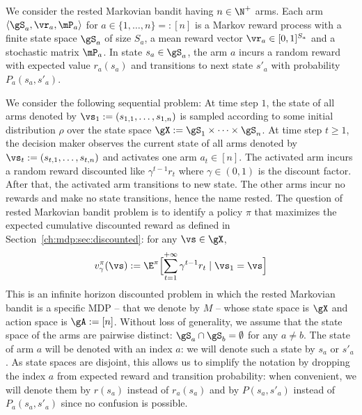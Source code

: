We consider the rested Markovian bandit having $n\in\N^+$ arms.
Each arm $\langle\gS_a, \vr_a, \mP_a\rangle$ for $a\in\{1,\dots,n\}=:[n]$ is a Markov reward process with a finite state space $\gS_a$ of size $S_a$, a mean reward vector $\vr_a\in[0,1]^{S_a}$ and a stochastic matrix $\mP_a$.
In state $s_a\in\gS_a$, the arm $a$ incurs a random reward with expected value $r_a(s_a)$ and transitions to next state $s'_a$ with probability $P_a(s_a,s'_a)$.

We consider the following sequential problem: At time step $1$, the state of all arms denoted by $\vs_1:=(s_{1,1},\dots,s_{1,n})$ is sampled according to some initial distribution $\rho$ over the state space $\gX:=\gS_1\times\dots\times\gS_n$.
At time step $t\ge1$, the decision maker observes the current state of all arms denoted by $\vs_t:=(s_{t,1},\dots,s_{t,n})$ and activates one arm $a_t\in[n]$.
The activated arm incurs a random reward discounted like $\gamma^{t-1}r_t$ where $\gamma\in(0,1)$ is the discount factor.
After that, the activated arm transitions to new state. %
The other arms incur no rewards and make no state transitions, hence the name rested.
The question of rested Markovian bandit problem is to identify a policy $\pi$ that maximizes the expected cumulative discounted reward as defined in Section~\ref{ch:mdp:sec:discounted}: for any $\vs\in\gX$,
\begin{equation}
    \label{ch:mb:value}
    v_\gamma^\pi(\vs):=\E^\pi\Bigl[\sum_{t=1}^{+\infty} \gamma^{t-1}r_t \mid \vs_1=\vs\Bigr]
\end{equation}
This is an infinite horizon discounted problem in which the rested Markovian bandit is a specific MDP -- that we denote by $M$ -- whose state space is $\gX$ and action space is $\gA:=[n]$.
Without loss of generality, we assume that the state space of the arms are pairwise distinct: $\gS_a\cap\gS_b=\emptyset$ for any $a\neq b$.
The state of arm $a$ will be denoted with an index $a$: we will denote such a state by $s_a$ or $s'_a$.
As state spaces are disjoint, this allows us to simplify the notation by dropping the index $a$ from expected reward and transition probability: when convenient, we will denote them by $r(s_a)$ instead of $r_a(s_a)$ and by $P(s_a,s'_a)$ instead of $P_a(s_a,s'_a)$ since no confusion is possible.
